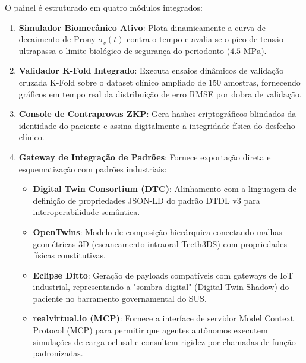 O painel é estruturado em quatro módulos integrados:
\begin{enumerate}
    \item \textbf{Simulador Biomecânico Ativo}: Plota dinamicamente a curva de decaimento de Prony $\sigma_v(t)$ contra o tempo e avalia se o pico de tensão ultrapassa o limite biológico de segurança do periodonto ($4.5\text{ MPa}$).
    \item \textbf{Validador K-Fold Integrado}: Executa ensaios dinâmicos de validação cruzada K-Fold sobre o dataset clínico ampliado de 150 amostras, fornecendo gráficos em tempo real da distribuição de erro RMSE por dobra de validação.
    \item \textbf{Console de Contraprovas ZKP}: Gera hashes criptográficos blindados da identidade do paciente e assina digitalmente a integridade física do desfecho clínico.
    \item \textbf{Gateway de Integração de Padrões}: Fornece exportação direta e esquematização com padrões industriais:
    \begin{itemize}
        \item \textbf{Digital Twin Consortium (DTC)}: Alinhamento com a linguagem de definição de propriedades JSON-LD do padrão DTDL v3 para interoperabilidade semântica.
        \item \textbf{OpenTwins}: Modelo de composição hierárquica conectando malhas geométricas 3D (escaneamento intraoral Teeth3DS) com propriedades físicas constitutivas.
        \item \textbf{Eclipse Ditto}: Geração de payloads compatíveis com gateways de IoT industrial, representando a "sombra digital" (Digital Twin Shadow) do paciente no barramento governamental do SUS.
        \item \textbf{realvirtual.io (MCP)}: Fornece a interface de servidor Model Context Protocol (MCP) para permitir que agentes autônomos executem simulações de carga oclusal e consultem rigidez por chamadas de função padronizadas.
    \end{itemize}
\end{enumerate}

